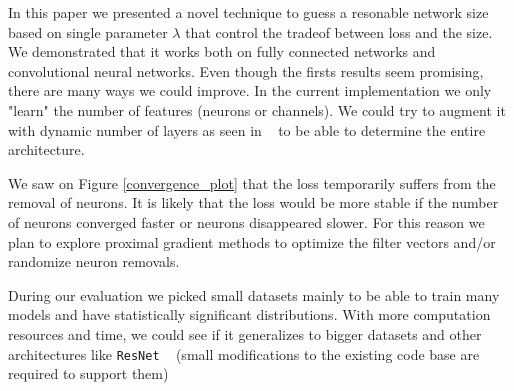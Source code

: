 \documentclass[sigconf]{acmart}
\begin{document}
In this paper we presented a novel technique to guess a resonable network size
based on single parameter $\lambda$ that control the tradeof between loss and
the size. We demonstrated that it works both on fully connected networks and
convolutional neural networks.  Even though the firsts results seem promising,
there are many ways we could improve. In the current implementation we only
"learn" the number of features (neurons or channels). We could try to augment
it with dynamic number of layers as seen in ~\cite{meier} to be able to
determine the entire architecture. \par We saw on Figure \ref{convergence_plot}
that the loss temporarily suffers from the removal of neurons. It is likely
that the loss would be more stable if the number of neurons converged faster or
neurons disappeared slower. For this reason we plan to explore proximal
gradient methods to optimize the filter vectors and/or randomize neuron
removals. \par During our evaluation we picked small datasets mainly to be able
to train many models and have statistically significant distributions. With
more computation resources and time, we could see if it generalizes to bigger
datasets and other architectures like \texttt{ResNet} ~\cite{He2016} (small
modifications to the existing code base are required to support them)



\end{document}
